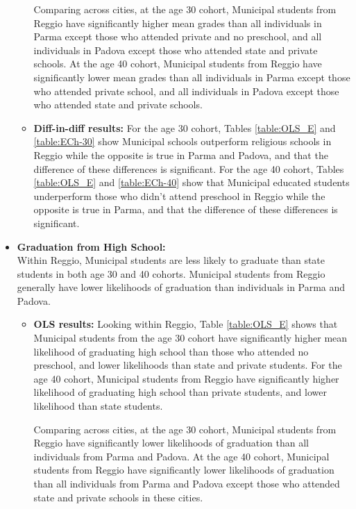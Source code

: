\documentclass[11pt]{article}
\begin{document}
\begin{itemize}
\begin{itemize}
	Comparing across cities, at the age 30 cohort, Municipal students from Reggio have significantly higher mean grades than all individuals in Parma except those who attended private and no preschool, and all individuals in Padova except those who attended state and private schools. At the age 40 cohort, Municipal students from Reggio have significantly lower mean grades than all individuals in Parma except those who attended private school, and all individuals in Padova except those who attended state and private schools. 

	\item \textbf{Diff-in-diff results:} For the age 30 cohort, Tables \ref{table:OLS_E} and \ref{table:ECh-30} show Municipal schools outperform religious schools in Reggio while the opposite is true in Parma and Padova, and that the difference of these differences is significant. For the age 40 cohort, Tables \ref{table:OLS_E} and \ref{table:ECh-40} show that Municipal educated students underperform those who didn't attend preschool in Reggio while the opposite is true in Parma, and that the difference of these differences is significant.

	\end{itemize}

\item \textbf{Graduation from High School:} \\
Within Reggio, Municipal students are less likely to graduate than state students in both age 30 and 40 cohorts. Municipal students from Reggio generally have lower likelihoods of graduation than individuals in Parma and Padova.
	\begin{itemize}
	\item \textbf{OLS results:} Looking within Reggio, Table \ref{table:OLS_E} shows that Municipal students from the age 30 cohort have significantly higher mean likelihood of graduating high school than those who attended no preschool, and lower likelihoods than state and private students. For the age 40 cohort, Municipal students from Reggio have significantly higher likelihood of graduating high school than private students, and lower likelihood than state students. 

	Comparing across cities, at the age 30 cohort, Municipal students from Reggio have significantly lower likelihoods of graduation than all individuals from Parma and Padova. At the age 40 cohort, Municipal students from Reggio have significantly lower likelihoods of graduation than all individuals from Parma and Padova except those who attended state and private schools in these cities. 


\end{itemize}
\end{itemize}
\end{document}
